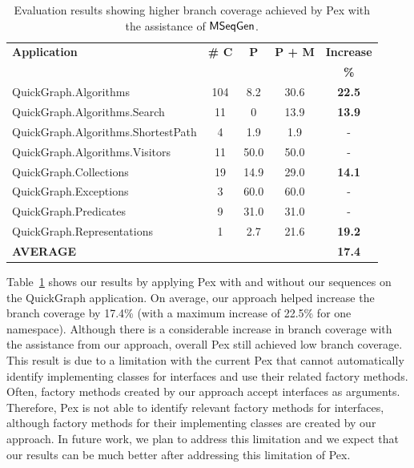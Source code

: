 \documentclass{sig-alternate}
\begin{document}
\setlength{\tabcolsep}{1pt}
\begin{table}[t]
\begin{SmallOut}
\begin{CodeOut}
\begin{center}
\begin {tabular} {|l|c|c|c|c|}
\hline
\textbf{Application} & \textbf{\# C} & \textbf{P} & \textbf{P + M} & \textbf{Increase}\\
 &  &  &  & \textbf{\%}\\
\hline
\hline QuickGraph.Algorithms & 104 & 8.2 & 30.6 & \textbf{22.5}\\
\hline QuickGraph.Algorithms.Search & 11 & 0 & 13.9 & \textbf{13.9}\\
\hline QuickGraph.Algorithms.ShortestPath & 4 & 1.9 & 1.9 & -\\
\hline QuickGraph.Algorithms.Visitors & 11 & 50.0 & 50.0 & -\\
\hline QuickGraph.Collections & 19 & 14.9 & 29.0 & \textbf{14.1}\\
\hline QuickGraph.Exceptions & 3 & 60.0 & 60.0 & -\\
\hline QuickGraph.Predicates & 9 & 31.0 & 31.0 & -\\
\hline QuickGraph.Representations & 1 & 2.7 & 21.6 & \textbf{19.2}\\
\hline \textbf{AVERAGE} &  & & & \textbf{17.4}\\
\hline
\end{tabular}
\end{center}
\end{CodeOut}
\end{SmallOut}\vspace*{-4ex}
\centering \caption {\label{tab:pexresults} Evaluation results showing higher branch coverage achieved by Pex with the assistance of $\textsf{MSeqGen} $. }\vspace*{-3ex}
\end{table}

Table~\ref{tab:pexresults} shows our results by applying Pex with and without our sequences on the QuickGraph application. On average, our approach helped increase the branch coverage by 17.4\% (with a maximum increase of 22.5\% for one namespace). Although there is a considerable increase in branch coverage with the assistance from our approach, overall Pex still achieved low branch coverage. This result is due to a limitation with the current Pex that cannot automatically identify implementing classes for interfaces and use their related factory methods. Often, factory methods created by our approach accept interfaces as arguments. Therefore, Pex is not able to identify relevant factory methods for interfaces, although factory methods for their implementing classes are created by our approach. In future work, we plan to address this limitation and we expect that our results can be much better after addressing this limitation of Pex.
\end{document}
